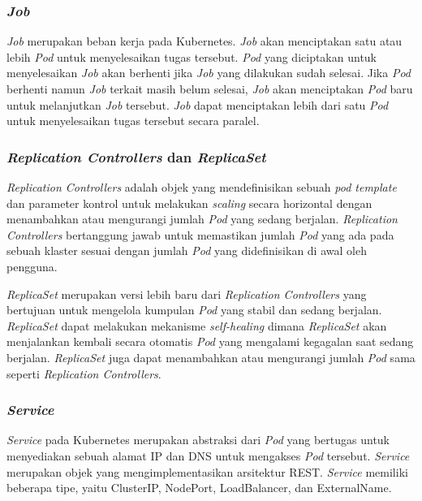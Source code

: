 \subsubsection{\emph{Job}}

\emph{Job} merupakan beban kerja pada Kubernetes. \emph{Job} akan menciptakan satu atau
lebih \emph{Pod} untuk menyelesaikan tugas tersebut. \emph{Pod} yang diciptakan untuk menyelesaikan
\emph{Job} akan berhenti jika \emph{Job} yang dilakukan sudah selesai. Jika \emph{Pod}
berhenti namun \emph{Job} terkait masih belum selesai, \emph{Job} akan menciptakan \emph{Pod}
baru untuk melanjutkan \emph{Job} tersebut. \emph{Job} dapat menciptakan lebih dari satu
\emph{Pod} untuk menyelesaikan tugas tersebut secara paralel.

\subsubsection{\emph{Replication Controllers} dan \emph{ReplicaSet}}

\emph{Replication Controllers} adalah objek yang mendefinisikan sebuah \emph{pod template}
dan parameter kontrol untuk melakukan \emph{scaling} secara horizontal dengan menambahkan
atau mengurangi jumlah \emph{Pod} yang sedang berjalan. \emph{Replication Controllers}
bertanggung jawab untuk memastikan jumlah \emph{Pod} yang ada pada sebuah klaster
sesuai dengan jumlah \emph{Pod} yang didefinisikan di awal oleh pengguna.

\emph{ReplicaSet} merupakan versi lebih baru dari \emph{Replication Controllers} yang
bertujuan untuk mengelola kumpulan \emph{Pod} yang stabil dan sedang berjalan. \emph{ReplicaSet}
dapat melakukan mekanisme \emph{self-healing} dimana \emph{ReplicaSet} akan menjalankan
kembali secara otomatis \emph{Pod} yang mengalami kegagalan saat sedang berjalan. \emph{ReplicaSet}
juga dapat menambahkan atau mengurangi jumlah \emph{Pod} sama seperti \emph{Replication Controllers}.

\subsubsection{\emph{Service}}

\emph{Service} pada Kubernetes merupakan abstraksi dari \emph{Pod} yang bertugas untuk
menyediakan sebuah alamat IP dan DNS untuk mengakses \emph{Pod} tersebut. \emph{Service}
merupakan objek yang mengimplementasikan arsitektur REST. \emph{Service} memiliki beberapa tipe,
yaitu ClusterIP, NodePort, LoadBalancer, dan ExternalName.

